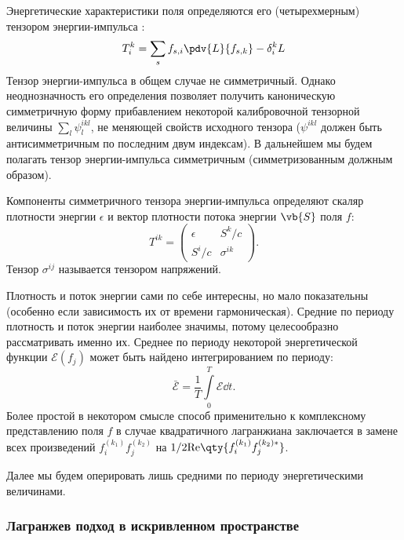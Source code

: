 \documentclass[\docroot/reports/draft/report.tex]{subfiles}
\begin{document}
    Энергетические характеристики поля определяются его (четырехмерным) тензором энергии-импульса \cite{landau_v1,landau_v2}:
    \begin{equation}
        T_i^k = \sum_s f_{s,i} \pdv{L}{f_{s,k}} - \delta_i^k L
    \end{equation}
    Тензор энергии-импульса в общем случае не симметричный. Однако неоднозначность его определения позволяет получить каноническую симметричную форму прибавлением некоторой калибровочной тензорной величины $\sum\limits_l \psi^{ikl}_l$, не меняющей свойств исходного тензора ($\psi^{ikl}$ должен быть антисимметричным по последним двум индексам). В дальнейшем мы будем полагать тензор энергии-импульса симметричным (симметризованным должным образом).

    Компоненты симметричного тензора энергии-импульса определяют скаляр плотности энергии $\epsilon$ и вектор плотности потока энергии $\vb{S}$ поля $f$:
    \begin{equation}
        T^{ik} = \begin{pmatrix}
            \epsilon & S^k / c \\
            S^i / c  & \sigma^{ik}
        \end{pmatrix} .
    \end{equation}
    Тензор $\sigma^{ij}$ называется тензором напряжений.

    Плотность и поток энергии сами по себе интересны, но мало показательны (особенно если зависимость их от времени гармоническая). Средние по периоду плотность и поток энергии наиболее значимы, потому целесообразно рассматривать именно их. Среднее по периоду некоторой энергетической функции $\mathscr{E}(f_j)$ может быть найдено интегрированием по периоду:
    \begin{equation}
        \bar{\mathscr{E}} = \frac{1}{T} \int\limits_0^T \mathscr{E} \dd{t} .
    \end{equation}
    Более простой в некотором смысле способ применительно к комплексному представлению поля $f$ в случае квадратичного лагранжиана заключается в замене всех произведений $f^{(k_1)}_i f^{(k_2)}_j$ на $1/2 \mathrm{Re}\qty{f^{(k_1)}_i f^{(k_2)*}_j}$.

    Далее мы будем оперировать лишь средними по периоду энергетическими величинами.

\subsubsection{Лагранжев подход в искривленном пространстве}
\end{document}
